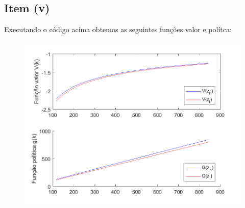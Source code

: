 \documentclass{article}
\begin{document}
\newpage
\subsection*{Item (v)}

Executando o código acima obtemos as seguintes funções valor e polítca:

\begin{figure}[!ht]
  \includegraphics[scale=0.6]{ex3/ex3_1.png}
\end{figure}
\end{document}
